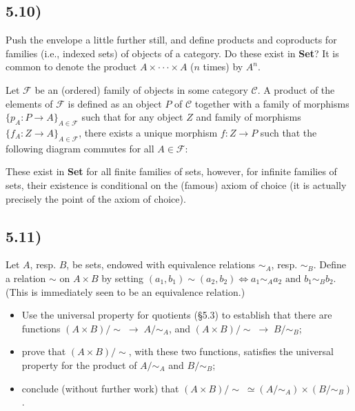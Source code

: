 \subsection*{5.10)}

Push the envelope a little further still, and deﬁne products and coproducts for families (i.e., indexed sets) of objects of a category. Do these exist in \textbf{Set}? It is common to denote the product $A \times \cdot \cdot \cdot \times A$ ($n$ times) by $A^n$.

Let $\mathcal{F}$ be an (ordered) family of objects in some category $\mathcal{C}$. A product of the elements of $\mathcal{F}$ is defined as an object $P$ of $\mathcal{C}$ together with a family of morphisms $\{p_A : P \to A\}_{A \in \mathcal{F}}$ such that for any object $Z$ and family of morphisms $\{f_A : Z \to A\}_{A \in \mathcal{F}}$, there exists a unique morphism $f : Z \to P$ such that the following diagram commutes for all $A \in \mathcal{F}$:


These exist in \textbf{Set} for all finite families of sets, however, for infinite families of sets, their existence is conditional on the (famous) axiom of choice (it is actually precisely the point of the axiom of choice).




\subsection*{5.11)}

Let $A$, resp. $B$, be sets, endowed with equivalence relations $\sim_A$, resp. $\sim_B$. Define a relation $\sim$ on $A \times B$ by setting $(a_1, b_1) \sim (a_2, b_2) \Leftrightarrow a_1 \sim_A a_2 \text{ and } b_1 \sim_B b_2.$ (This is immediately seen to be an equivalence relation.)
\begin{itemize}
	\item Use the universal property for quotients (§5.3) to establish that there are functions $(A \times B)/\sim \; \to \; A/\sim_A$, and $(A \times B)/\sim \; \to \; B/\sim_B$;
	\item prove that $(A \times B)/\sim$, with these two functions, satisfies the universal property for the product of $A/\sim_A$ and $B/\sim_B$;
	\item conclude (without further work) that $(A \times B)/ \sim \; \simeq (A / \sim_A) \times (B / \sim_B)$.
\end{itemize}

